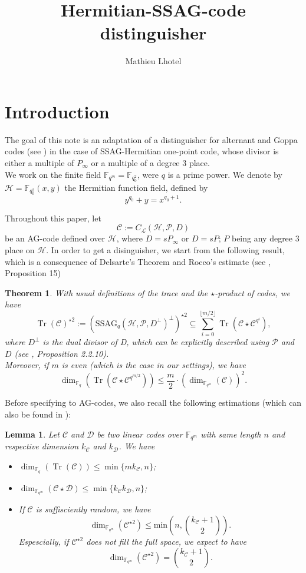 \documentclass[a4paper]{article}
\title{Hermitian-SSAG-code distinguisher}
\author{Mathieu Lhotel}
\date{}
\newtheorem{thm}{Theorem}
\newtheorem{lem1}{Lemma}
\newcommand{\calP}{\mathcal{P}}
\newcommand{\calH}{\mathcal{H}}
\newcommand{\calL}{\mathcal{L}}
\newcommand{\calC}{\mathcal{C}}
\newcommand{\calD}{\mathcal{D}}
\newcommand{\Tr}{\operatorname{Tr}}
\newcommand{\fqm}{\mathbb{F}_{q^m}}
\begin{document}
\maketitle

\section{Introduction}


The goal of this note is an adaptation of a distinguisher for alternant and Goppa codes (see \cite{rocco}) in the case of SSAG-Hermitian one-point code, whose divisor is either a multiple of $P_{\infty}$ or a multiple of a degree 3 place. \\
We work on the finite field $\mathbb{F}_{q^m}=\mathbb{F}_{q_0^2}$, were $q$ is a prime power. We denote by $\calH = \mathbb{F}_{q_0^2}(x,y)$ the Hermitian function field, defined by 
\[ y^{q_0}+y=x^{q_0+1}.\]

Throughout this paper, let
\[\mathcal{C} := C_{\calL}(\calH,\mathcal{P},D) \]
be an AG-code defined over $\calH$, where $D=sP_{\infty}$ or $D=sP$; $P$ being any degree 3 place on $\calH$. 
In order to get a disinguisher, we start from the following result, which is a consequence of Delsarte's Theorem and Rocco's estimate (see \cite{rocco}, Proposition 15)

\begin{thm} \label{th1}
With usual definitions of the trace and the $\star$-product of codes, we have 
\[ \Tr(\mathcal{C})^{\star2} := (\mathrm{SSAG}_{q}(\calH,\calP,D^{\perp})^{\perp})^{\star2} \subseteq \sum\limits_{i=0}^{\lfloor{m/2} \rfloor} \Tr(\mathcal{C}\star\mathcal{C}^{q^i}),\]
where $D^{\perp}$ is the dual divisor of D, which can be explicitly described using $\calP$ and $D$ (see \cite{sti}, Proposition 2.2.10). \\
Moreover, if $m$ is even (which is the case in our settings), we have 
\[\dim_{\mathbb{F}_q}(\Tr(\calC \star \calC^{q^{m/2}})) \leq \frac{m}{2}\cdot (\dim_{\fqm}(\calC))^2.\]
\end{thm}

Before specifying to AG-codes, we also recall the following estimations (which can also be found in \cite{rocco}):

\begin{lem1} \label{known_bounds}
Let $\calC$ and $\calD$ be two linear codes over $\fqm$ with same length $n$ and respective dimension $k_{\calC}$ and $k_{\calD}$. We have
\begin{itemize}
    \item[$(1)$] $\dim_{\mathbb{F}_q}(\Tr(\calC)) \leq \min\{mk_{\calC},n\}$;
    \item[$(2)$] $\dim_{\fqm}(\calC \star \calD) \leq \min\{k_{\calC}k_{\calD},n\}$;
    \item[$(3)$] If $\calC$ is suffisciently random, we have
     \[ \dim_{\mathbb{F}_{q^m}}(\calC^{\star2}) \leq \mathrm{min}\left(n,\binom{k_{\calC}+1}{2}\right) . \]
     Espescially, if $\calC^{\star2}$ does not fill the full space, we expect to have 
     \[ \dim_{\mathbb{F}_{q^m}}(\calC^{\star2}) = \binom{k_{\calC}+1}{2}.\]
\end{itemize}
\end{lem1}
\end{document}
